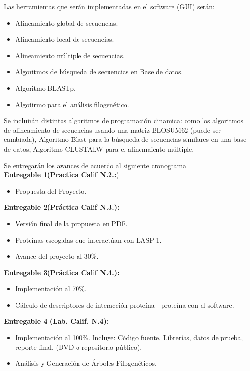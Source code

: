 \documentclass[twocolumn,twoside,12pt]{article}
\begin{document}
Las herramientas que ser\'an implementadas en el software (GUI) ser\'an: 
\begin{itemize}
 \item Alineamiento global de secuencias. 
 \item Alineamiento local de secuencias. 
 \item Alineamiento m\'ultiple de secuencias.
 \item Algoritmos de b\'usqueda de secuencias en Base de datos.
 \item Algoritmo BLASTp.
 \item Algotirmo para el an\'alisis filogen\'etico.
\end{itemize}

  
Se incluir\'an distintos algoritmos de programaci\'on dinamica: como los algoritmos de alineamiento de secuencias usando una matriz BLOSUM62 (puede ser cambiada), Algoritmo Blast para la b\'usqueda de secuencias similares en una base de datos, Algoritmo CLUSTALW para el alinemaiento m\'ultiple.  

Se entregar\'an los avances de acuerdo al siguiente cronograma:\\

\textbf{Entregable 1(Practica Calif N.2.:})
\begin{itemize}
\item Propuesta del Proyecto.\\
\end{itemize}


\textbf{Entregable 2(Práctica Calif N.3.):}
\begin{itemize}
\item Versi\'on final de la propuesta en PDF.
\item Prote\'inas escogidas que interact\'uan con LASP-1.
\item Avance del proyecto al 30\%.\\
\end{itemize}

\textbf{Entregable 3(Práctica Calif N.4.):}
\begin{itemize}
\item Implementaci\'on al 70\%.
\item C\'alculo de descriptores de interacci\'on prote\'ina - prote\'ina con el software.\\

\end{itemize}

\textbf{Entregable 4 (Lab. Calif. N.4):}
\begin{itemize}
\item Implementaci\'on al 100\%. Incluye: C\'odigo fuente, Librer\'ias, datos de
prueba, reporte final. (DVD o repositorio p\'ublico).
\item An\'alisis y Generaci\'on de \'Arboles Filogen\'eticos.\\


\end{itemize}
\end{document}
